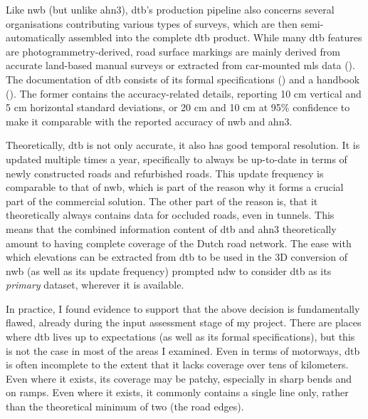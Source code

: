 Like \ac{nwb} (but unlike \ac{ahn3}), \ac{dtb}’s production pipeline also concerns several organisations contributing various types of surveys, which are then semi-automatically assembled into the complete \ac{dtb} product. While many \ac{dtb} features are photogrammetry-derived, road surface markings are mainly derived from accurate land-based manual surveys or extracted from car-mounted \ac{mls} data (\cite{oudeElberink_vosselman_2012}). The documentation of \ac{dtb} consists of its formal specifications (\cite{dtb_docs}) and a handbook (\cite{dtb_handbook}). The former contains the accuracy-related details, reporting 10 cm vertical and 5 cm horizontal standard deviations, or 20 cm and 10 cm at 95\% confidence to make it comparable with the reported accuracy of \ac{nwb} and \ac{ahn3}.

Theoretically, \ac{dtb} is not only accurate, it also has good temporal resolution. It is updated multiple times a year, specifically to always be up-to-date in terms of newly constructed roads and refurbished roads. This update frequency is comparable to that of \ac{nwb}, which is part of the reason why it forms a crucial part of the commercial solution. The other part of the reason is, that it theoretically always contains data for occluded roads, even in tunnels. This means that the combined information content of \ac{dtb} and \ac{ahn3} theoretically amount to having complete coverage of the Dutch road network. The ease with which elevations can be extracted from \ac{dtb} to be used in the 3D conversion of \ac{nwb} (as well as its update frequency) prompted \ac{ndw} to consider \ac{dtb} as its \textit{primary} dataset, wherever it is available.

In practice, I found evidence to support that the above decision is fundamentally flawed, already during the input assessment stage of my project. There are places where \ac{dtb} lives up to expectations (as well as its formal specifications), but this is not the case in most of the areas I examined. Even in terms of motorways, \ac{dtb} is often incomplete to the extent that it lacks coverage over tens of kilometers. Even where it exists, its coverage may be patchy, especially in sharp bends and on ramps. Even where it exists, it commonly contains a single line only, rather than the theoretical minimum of two (the road edges).

